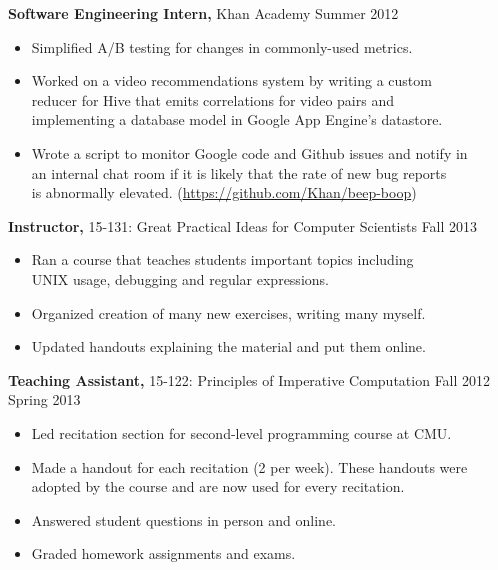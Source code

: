 \documentclass[margin]{res}
\begin{document}
\begin{resume}
  \textbf{Software Engineering Intern,} Khan Academy \hfill Summer 2012
  \begin{itemize} \itemsep -2pt %
  \item Simplified A/B testing for changes in commonly-used metrics.
  \item Worked on a video recommendations system by writing a custom \\
    reducer for Hive that emits correlations for video pairs and \\
      implementing a database model in Google App Engine's datastore.
  \item Wrote a script to monitor Google code and Github issues and notify in \\
      an internal chat room if it is likely that the rate of new bug reports \\
      is abnormally elevated.
      (\href{https://github.com/Khan/beep-boop}
            {https://github.com/Khan/beep-boop})
  \end{itemize}

  \textbf{Instructor,} 15-131: Great Practical Ideas for Computer Scientists
    \hfill Fall 2013
  \begin{itemize} \itemsep -2pt
    \item Ran a course that teaches students important topics including\\
      UNIX usage, debugging and regular expressions.
    \item Organized creation of many new exercises, writing many myself.
    \item Updated handouts explaining the material and put them online.
  \end{itemize}

  \textbf{Teaching Assistant,} 15-122: Principles of Imperative Computation
    \hfill Fall 2012\\ \hphantom{1em} \hfill Spring 2013

  \vspace{-1em}\vspace{-1ex}
  \begin{itemize} \itemsep -2pt
    \item Led recitation section for second-level programming course at CMU.
    \item Made a handout for each recitation (2 per week). These handouts were \\
      adopted by the course and are now used for every recitation.
    \item Answered student questions in person and online.
    \item Graded homework assignments and exams.
  \end{itemize}


\end{resume}
\end{document}
